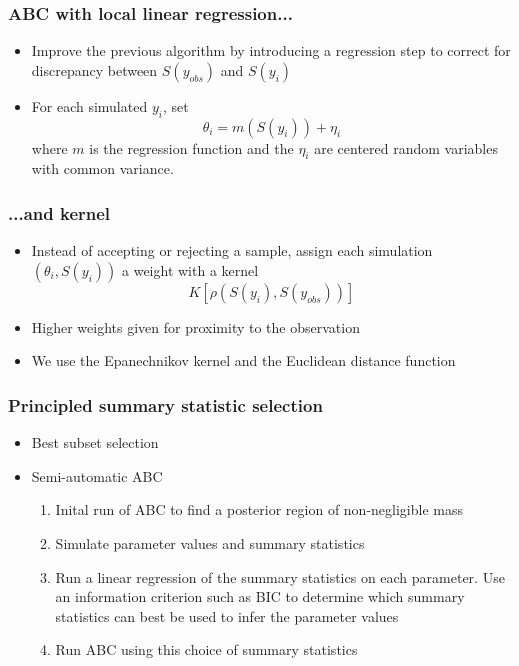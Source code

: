 \documentclass{beamer}
\begin{document}
\begin{frame}
\frametitle{ABC with local linear regression...}
\begin{itemize}
\item Improve the previous algorithm by introducing a regression step to correct for discrepancy between $S(y_{obs})$ and $S(y_i)$
\item For each simulated $y_i$, set
\[
\theta_i = m(S(y_i)) + \eta_i
\]
where $m$ is the regression function and the $\eta_i$ are centered random variables with common variance. 
\end{itemize}
\end{frame}

\begin{frame}
\frametitle{...and kernel}
\begin{itemize}
\item Instead of accepting or rejecting a sample, assign each simulation $(\theta_i, S(y_i))$ a weight with a kernel
\[
K[\rho(S(y_i), S(y_{obs}))]
\]
\item Higher weights given for proximity to the observation
\item We use the Epanechnikov kernel and the Euclidean distance function
\end{itemize}
\end{frame}

\begin{frame}
\frametitle{Principled summary statistic selection}
\begin{itemize}
\item Best subset selection
\pause
\item Semi-automatic ABC
\begin{enumerate}
\item Inital run of ABC to find a posterior region of non-negligible mass
\item Simulate parameter values and summary statistics
\item Run a linear regression of the summary statistics on each parameter. Use an information criterion such as BIC to determine which summary statistics can best be used to infer the parameter values
\item Run ABC using this choice of summary statistics
\end{enumerate}
\end{itemize}
\end{frame}
\end{document}
